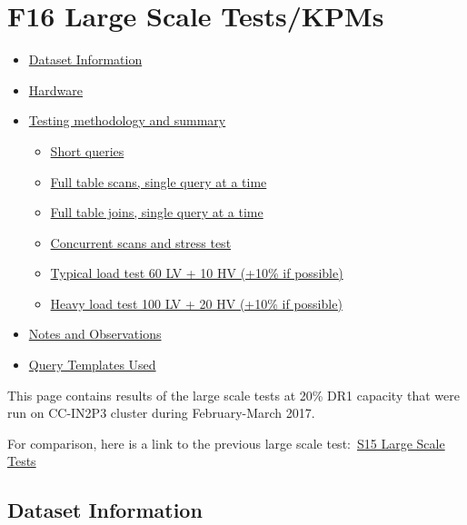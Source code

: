 \section{F16 Large Scale Tests/KPMs}\label{f16-large-scale-testskpms}

\begin{itemize}
\item
  \protect\hyperlink{F16LargeScaleTestsux2fKPMs-DatasetInformat}{Dataset
  Information}
\item
  \protect\hyperlink{F16LargeScaleTestsux2fKPMs-Hardware}{Hardware}
\item
  \protect\hyperlink{F16LargeScaleTestsux2fKPMs-Testingmethodol}{Testing
  methodology and summary}

  \begin{itemize}
  \item
    \protect\hyperlink{F16LargeScaleTestsux2fKPMs-Shortqueries}{Short
    queries}
  \item
    \protect\hyperlink{F16LargeScaleTestsux2fKPMs-Fulltablescansux2c}{Full
    table scans, single query at a time}
  \item
    \protect\hyperlink{F16LargeScaleTestsux2fKPMs-Fulltablejoinsux2c}{Full
    table joins, single query at a time}
  \item
    \protect\hyperlink{F16LargeScaleTestsux2fKPMs-Concurrentscans}{Concurrent
    scans and stress test}
  \item
    \protect\hyperlink{F16LargeScaleTestsux2fKPMs-Typicalloadtest}{Typical
    load test 60 LV + 10 HV (+10\% if possible)}
  \item
    \protect\hyperlink{F16LargeScaleTestsux2fKPMs-Heavyloadtest10}{Heavy
    load test 100 LV + 20 HV (+10\% if possible)}
  \end{itemize}
\item
  \protect\hyperlink{F16LargeScaleTestsux2fKPMs-NotesandObserva}{Notes
  and Observations}
\item
  \protect\hyperlink{F16LargeScaleTestsux2fKPMs-QueryTemplatesU}{Query
  Templates Used}
\end{itemize}

This page contains results of the large scale tests at 20\% DR1 capacity
that were run on CC-IN2P3 cluster during February-March 2017.

For comparison, here is a link to the previous large scale
test:~\href{file:////display/DM/S15+Large+Scale+Tests}{S15 Large Scale
Tests}

\subsection{Dataset Information}\label{dataset-information}

